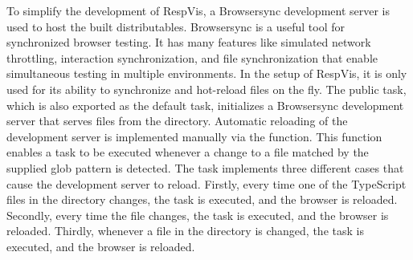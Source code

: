 To simplify the development of RespVis, a Browsersync \parencite{Browsersync} development server is used to host the built distributables.
Browsersync is a useful tool for synchronized browser testing.
It has many features like simulated network throttling, interaction synchronization, and file synchronization that enable simultaneous testing in multiple environments.
In the setup of RespVis, it is only used for its ability to synchronize and hot-reload files on the fly.
The public  task, which is also exported as the default task, initializes a Browsersync development server that serves files from the  directory.
Automatic reloading of the development server is implemented manually via the  function.
This function enables a task to be executed whenever a change to a file matched by the supplied glob pattern is detected.
The  task implements three different cases that cause the development server to reload.
Firstly, every time one of the TypeScript files in the  directory changes, the  task is executed, and the browser is reloaded.
Secondly, every time the  file changes, the  task is executed, and the browser is reloaded.
Thirdly, whenever a file in the  directory is changed, the  task is executed, and the browser is reloaded.